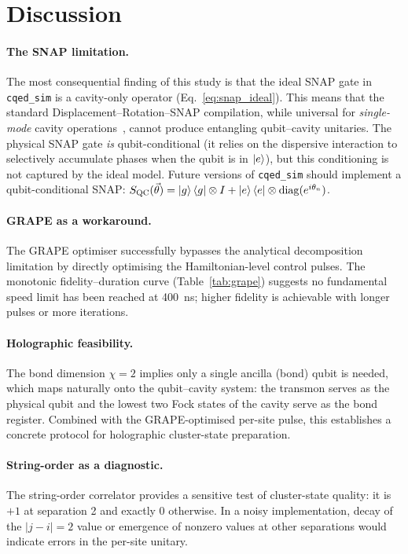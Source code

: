 \documentclass[aps,pra,twocolumn,reprint,floatfix,amsmath,amssymb]{revtex4-2}
\begin{document}
\section{Discussion}\label{sec:discussion}

\paragraph{The SNAP limitation.}
The most consequential finding of this study is that the ideal SNAP
gate in \texttt{cqed\_sim} is a cavity-only operator
(Eq.~\ref{eq:snap_ideal}).  This means that the standard
Displacement--Rotation--SNAP compilation, while universal for
\emph{single-mode} cavity operations~\cite{heeres2017implementing},
cannot produce entangling qubit--cavity unitaries.  The physical
SNAP gate \emph{is} qubit-conditional (it relies on the dispersive
interaction to selectively accumulate phases when the qubit is in
$\ket{e}$), but this conditioning is not captured by the ideal
model.  Future versions of \texttt{cqed\_sim} should implement a
qubit-conditional SNAP:
$S_\mathrm{QC}(\vec\theta)=\ket{g}\bra{g}\otimes I
+\ket{e}\bra{e}\otimes\mathrm{diag}(e^{i\theta_n})$.

\paragraph{GRAPE as a workaround.}
The GRAPE optimiser successfully bypasses the analytical
decomposition limitation by directly optimising the Hamiltonian-level
control pulses.  The monotonic fidelity--duration curve
(Table~\ref{tab:grape}) suggests no fundamental speed limit has been
reached at \SI{400}{ns}; higher fidelity is achievable with longer
pulses or more iterations.

\paragraph{Holographic feasibility.}
The bond dimension $\chi=2$ implies only a single ancilla (bond)
qubit is needed, which maps naturally onto the qubit--cavity system:
the transmon serves as the physical qubit and the lowest two Fock
states of the cavity serve as the bond register.  Combined with the
GRAPE-optimised per-site pulse, this establishes a concrete protocol
for holographic cluster-state preparation.

\paragraph{String-order as a diagnostic.}
The string-order correlator provides a sensitive test of cluster-state
quality: it is $+1$ at separation 2 and exactly 0 otherwise.  In a
noisy implementation, decay of the $|j-i|=2$ value or emergence of
nonzero values at other separations would indicate errors in the
per-site unitary.
\end{document}
